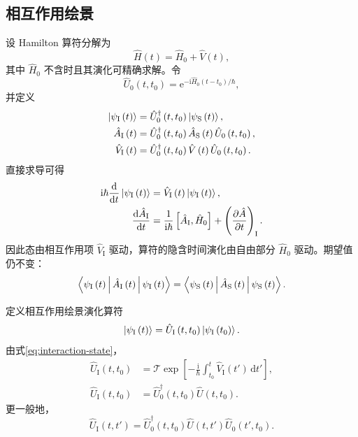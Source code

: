 \subsection{相互作用绘景}
设 Hamilton 算符分解为
\begin{equation}
\hat H\left(t\right)=\hat H_0+\hat V\left(t\right),
\end{equation}
其中 $\hat H_0$ 不含时且其演化可精确求解。令
\begin{equation}
\hat U_0\left(t,t_0\right)=
\mathrm{e}^{-\mathrm{i}\hat H_0\left(t-t_0\right)/\hbar},
\end{equation}
并定义
\begin{align}
\Ket{\psi_{\mathrm{I}}\left(t\right)}
&=\hat U_0^\dagger\left(t,t_0\right)\Ket{\psi_{\mathrm{S}}\left(t\right)},\\
\hat A_{\mathrm{I}}\left(t\right)
&=\hat U_0^\dagger\left(t,t_0\right)\hat A_{\mathrm{S}}\left(t\right)
\hat U_0\left(t,t_0\right),\\
\hat V_{\mathrm{I}}\left(t\right)
&=\hat U_0^\dagger\left(t,t_0\right)\hat V\left(t\right)
\hat U_0\left(t,t_0\right).
\end{align}
直接求导可得
\begin{align}
\mathrm{i}\hbar\frac{\mathrm{d}}{\mathrm{d}t}\Ket{\psi_{\mathrm{I}}\left(t\right)}
&=\hat V_{\mathrm{I}}\left(t\right)\Ket{\psi_{\mathrm{I}}\left(t\right)},
\label{eq:interaction-state}\\
\frac{\mathrm{d}\hat A_{\mathrm{I}}}{\mathrm{d}t}
&=\frac{1}{\mathrm{i}\hbar}\left[\hat A_{\mathrm{I}},\hat H_0\right]
+\left(\frac{\partial\hat A}{\partial t}\right)_{\mathrm{I}}.
\label{eq:interaction-operator}
\end{align}
因此态由相互作用项 $\hat V_{\mathrm{I}}$ 驱动，算符的隐含时间演化由自由部分 $\hat H_0$ 驱动。期望值仍不变：
\begin{equation}
\Braket{\psi_{\mathrm{I}}\left(t\right)|\hat A_{\mathrm{I}}\left(t\right)|
\psi_{\mathrm{I}}\left(t\right)}
=\Braket{\psi_{\mathrm{S}}\left(t\right)|\hat A_{\mathrm{S}}\left(t\right)|
\psi_{\mathrm{S}}\left(t\right)}.
\end{equation}

定义相互作用绘景演化算符
\begin{equation}
\Ket{\psi_{\mathrm{I}}\left(t\right)}=\hat U_{\mathrm{I}}\left(t,t_0\right)
\Ket{\psi_{\mathrm{I}}\left(t_0\right)}.
\end{equation}
由式\eqref{eq:interaction-state}，
\begin{align}
\hat U_{\mathrm{I}}\left(t,t_0\right)
&=\mathcal T\exp\left[-\frac{\mathrm{i}}{\hbar}
\int_{t_0}^{t}\hat V_{\mathrm{I}}\left(t'\right)\,\mathrm{d}t'\right],
\label{eq:interaction-U}\\
\hat U_{\mathrm{I}}\left(t,t_0\right)
&=\hat U_0^\dagger\left(t,t_0\right)\hat U\left(t,t_0\right).
\end{align}
更一般地，
\begin{equation}
\hat U_{\mathrm{I}}\left(t,t'\right)
=\hat U_0^\dagger\left(t,t_0\right)\hat U\left(t,t'\right)
\hat U_0\left(t',t_0\right).
\end{equation}

